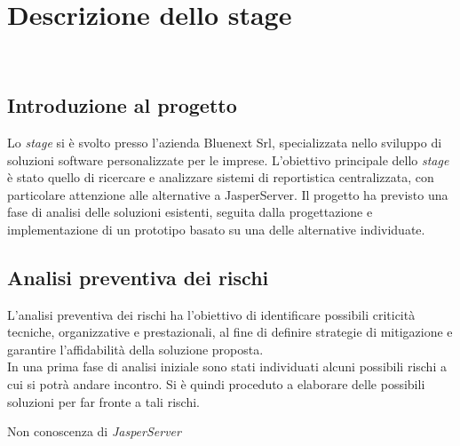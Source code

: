 \chapter{Descrizione dello stage}
\label{cap:descrizione-stage}

\\

\section{Introduzione al progetto}
Lo \emph{stage} si è svolto presso l'azienda Bluenext Srl, specializzata nello sviluppo di soluzioni software personalizzate per le imprese.
L'obiettivo principale dello \emph{stage} è stato quello di ricercare e analizzare sistemi di reportistica centralizzata, con particolare attenzione alle alternative a JasperServer.
Il progetto ha previsto una fase di analisi delle soluzioni esistenti, seguita dalla progettazione e implementazione di un prototipo basato su una delle alternative individuate.

\section{Analisi preventiva dei rischi}
L'analisi preventiva dei rischi ha l'obiettivo di identificare possibili criticità tecniche, organizzative e prestazionali, al fine di definire strategie di mitigazione e garantire l'affidabilità della soluzione proposta.\\ 
In una prima fase di analisi iniziale sono stati individuati alcuni possibili rischi a cui si potrà andare incontro.
Si è quindi proceduto a elaborare delle possibili soluzioni per far fronte a tali rischi.\\

\begin{risk}{Non conoscenza di \emph{JasperServer}}
    \vspace{0.5em}
    \vspace{0.5em}
    \vspace{0.5em}
    \vspace{0.5em}
    \label{risk:non-conoscenza-jasper} 
\end{risk}

